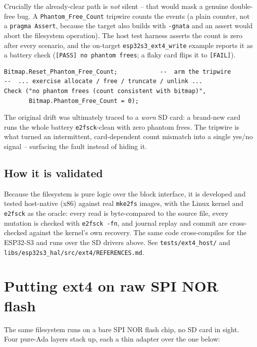 Crucially the already-clear path is \emph{not} silent -- that would mask a genuine
double-free bug. A \texttt{Phantom\_Free\_Count} tripwire counts the events (a plain
counter, not a \texttt{pragma Assert}, because the target also builds with
\texttt{-gnata} and an assert would abort the filesystem operation). The host test
harness asserts the count is zero after every scenario, and the on-target
\texttt{esp32s3\_ext4\_write} example reports it as a battery check
(\texttt{[PASS] no phantom frees}; a flaky card flips it to \texttt{[FAIL]}).

\begin{lstlisting}
Bitmap.Reset_Phantom_Free_Count;            --  arm the tripwire
--  ... exercise allocate / free / truncate / unlink ...
Check ("no phantom frees (count consistent with bitmap)",
       Bitmap.Phantom_Free_Count = 0);
\end{lstlisting}

The original drift was ultimately traced to a \emph{worn} SD card: a brand-new card
runs the whole battery \texttt{e2fsck}-clean with zero phantom frees. The tripwire
is what turned an intermittent, card-dependent count mismatch into a single
yes/no signal -- surfacing the fault instead of hiding it.

\subsection{How it is validated}

Because the filesystem is pure logic over the block interface, it is developed and
tested host-native (x86) against real \texttt{mke2fs} images, with the Linux
kernel and \texttt{e2fsck} as the oracle: every read is byte-compared to the
source file, every mutation is checked with \texttt{e2fsck -fn}, and journal
replay and commit are cross-checked against the kernel's own recovery. The same
code cross-compiles for the ESP32-S3 and runs over the SD drivers above. See
\texttt{tests/ext4\_host/} and \texttt{libs/esp32s3\_hal/src/ext4/REFERENCES.md}.

\section{Putting ext4 on raw SPI NOR flash}

The same filesystem runs on a bare SPI NOR flash chip, no SD card in sight. Four
pure-Ada layers stack up, each a thin adapter over the one below:

